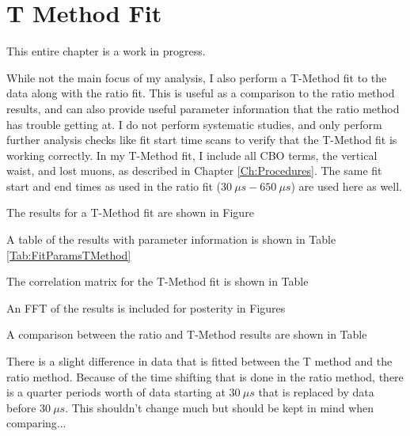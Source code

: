 \graphicspath{ {Figures/TMethod/ResidualsFFT/} }

\chapter{T Method Fit}
\label{Ch:TMethod}

This entire chapter is a work in progress.


While not the main focus of my analysis, I also perform a T-Method fit to the data along with the ratio fit. This is useful as a comparison to the ratio method results, and can also provide useful parameter information that the ratio method has trouble getting at. I do not perform systematic studies, and only perform further analysis checks like fit start time scans to verify that the T-Method fit is working correctly. In my T-Method fit, I include all CBO terms, the vertical waist, and lost muons, as described in Chapter \ref{Ch:Procedures}. The same fit start and end times as used in the ratio fit ($\SI{30}{\mu s} - \SI{650}{\mu s}$) are used here as well.

The results for a T-Method fit are shown in Figure 

A table of the results with parameter information is shown in Table \ref{Tab:FitParamsTMethod}

The correlation matrix for the T-Method fit is shown in Table

An FFT of the results is included for posterity in Figures 



A comparison between the ratio and T-Method results are shown in Table

There is a slight difference in data that is fitted between the T method and the ratio method. Because of the time shifting that is done in the ratio method, there is a quarter \gmtwo periods worth of data starting at $\SI{30}{\mu s}$ that is replaced by data before $\SI{30}{\mu s}$. This shouldn't change much but should be kept in mind when comparing...



